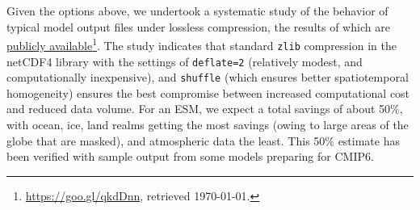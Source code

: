 \documentclass[gmd,manuscript]{copernicus}
\newcommand{\pllabel}[1]{\label{p-#1}\linelabel{l-#1}}
\newcommand{\urlref}[2] {\href{#1}{#2}\footnote{\url{#1}, retrieved \today.}}
\begin{document}
Given the options above, we undertook a systematic study of the
behavior of typical model output files under lossless compression, the
results of which are \urlref{https://goo.gl/qkdDnn}{publicly available}.
The study indicates that standard \texttt{zlib} compression in the
netCDF4 library with the settings of \texttt{deflate=2} (relatively
modest, and computationally inexpensive), and \texttt{shuffle} (which
ensures better spatiotemporal homogeneity) ensures the best compromise
between increased computational cost and reduced data volume. For an
ESM,
\pllabel{RC1-25}
we expect a total savings of about 50\%, with ocean, ice, land realms
getting the most savings (owing to large areas of the globe that are
masked), and atmospheric data the least. This 50\% estimate has been
verified with sample output from some models preparing for CMIP6.
\end{document}

